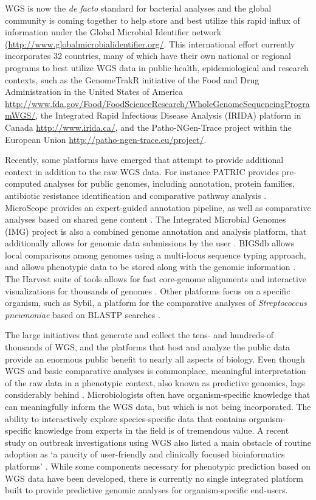 \documentclass[doublespacing, linenumbers]{bmcart}
\begin{document}
  WGS is now the \textit{de facto} standard for bacterial analyses and the global community is coming together to help store and best utilize this rapid influx of information under the Global Microbial Identifier network \url{(http://www.globalmicrobialidentifier.org/}. This international effort currently incorporates 32 countries, many of which have their own national or regional programs to best utilize WGS data in public health, epidemiological and research contexts, such as the GenomeTrakR initiative of the Food and Drug Administration in the United States of America \url{http://www.fda.gov/Food/FoodScienceResearch/WholeGenomeSequencingProgramWGS/}, the Integrated Rapid Infectious Disease Analysis (IRIDA) platform in Canada \url{http://www.irida.ca/}, and the Patho-NGen-Trace project within the European Union  \url{http://patho-ngen-trace.eu/project/}.

Recently, some platforms have emerged that attempt to provide additional context in addition to the raw WGS data. For instance PATRIC provides pre-computed analyses for public genomes, including annotation, protein families, antibiotic resistance identification and comparative pathway analysis \cite{wattam_patric_2013}.   MicroScope provides an expert-guided annotation pipeline, as well as comparative analyses based on shared gene content
\cite{vallenet_microscope--integrated_2012}. The Integrated Microbial Genomes (IMG) project is also a combined genome annotation and analysis platform, that additionally allows for genomic data submissions by the user \cite{markowitz_img_2013}. BIGSdb allows local comparisons among genomes using a multi-locus sequence typing approach, and allows phenotypic data to be stored along with the genomic information \cite{jolley_bigsdb:_2010}. The Harvest suite of tools allows for fast core-genome alignments and interactive visualizations for thousands of genomes \cite{treangen_rapid_2014}. Other platforms focus on  a specific organism, such as Sybil, a platform for the comparative analyses of \textit{Streptococcus pneumoniae} based on BLASTP searches \cite{riley_using_2012}. 

The large initiatives that generate and collect the tens- and hundreds-of thousands of WGS, and the platforms that host and analyze the public data provide an enormous public benefit to nearly all aspects of biology. Even though WGS and basic comparative analyses is commonplace, meaningful interpretation of the raw data in a phenotypic context, also known as predictive genomics, lags considerably behind \cite{sherry_outbreak_2013}. Microbiologists often have organism-specific knowledge that can meaningfully inform the WGS data, but which is not being incorporated.  The ability to interactively explore species-specific data that contains organism-specific knowledge from experts in the field is of tremendous value. A recent study on outbreak investigations using WGS also listed a main obstacle of routine adoption as `a paucity of user-friendly and clinically focused bioinformatics platforms'  \cite{sherry_outbreak_2013}. While some components necessary for phenotypic prediction based on WGS data have been developed, there is currently no single integrated platform built to provide predictive genomic analyses for organism-specific end-users.
\end{document}
